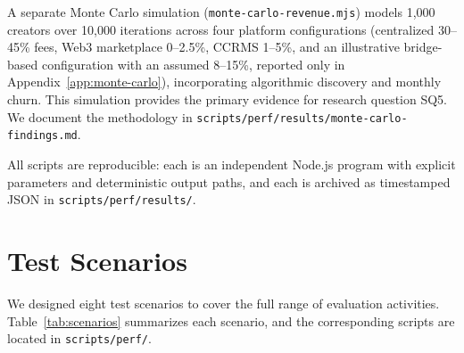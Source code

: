 A separate Monte Carlo simulation (\texttt{monte-carlo-revenue.mjs}) models 1,000 creators over 10,000 iterations across four platform configurations (centralized 30--45\% fees, Web3 marketplace 0--2.5\%, CCRMS 1--5\%, and an illustrative bridge-based configuration with an assumed 8--15\%, reported only in Appendix~\ref{app:monte-carlo}), incorporating algorithmic discovery and monthly churn. This simulation provides the primary evidence for research question SQ5. We document the methodology in \texttt{scripts/perf/results/monte-carlo-findings.md}.

All scripts are reproducible: each is an independent Node.js program with explicit parameters and deterministic output paths, and each is archived as timestamped JSON in \texttt{scripts/perf/results/}.

\section{Test Scenarios}\label{sec:test-scenarios}

We designed eight test scenarios to cover the full range of evaluation activities. Table~\ref{tab:scenarios} summarizes each scenario, and the corresponding scripts are located in \texttt{scripts/perf/}.

